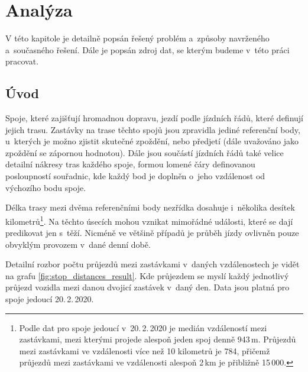 
\chapter{Analýza}

V této kapitole je detailně popsán řešený problém a~způsoby navrženého a~současného řešení. Dále je popsán zdroj dat, se kterým budeme v~této práci pracovat.

\section{Úvod}

Spoje, které zajišťují hromadnou dopravu, jezdí podle jízdních řádů, které definují jejich trasu. Zastávky na trase těchto spojů jsou zpravidla jediné referenční body, u~kterých je možno zjistit skutečné zpoždění, nebo předjetí (dále uvažováno jako zpoždění se zápornou hodnotou). Dále jsou součástí jízdních řádů také velice detailní nákresy tras každého spoje, formou lomené čáry definovanou posloupností souřadnic, kde každý bod je doplněn o~jeho vzdálenost od výchozího bodu spoje.

\bigbreak

Délka trasy mezi dvěma referenčními body nezřídka dosahuje i~několika desítek kilometrů\footnote{Podle dat pro spoje jedoucí v~20.\,2.\,2020 je medián vzdáleností mezi zastávkami, mezi kterými projede alespoň jeden spoj denně 943\,m. Průjezdů mezi zastávkami ve vzdálenosti více než 10 kilometrů je 784, přičemž průjezdů mezi zastávkami ve vzdálenosti alespoň 2\,km je přibližně 15\,000.}. Na těchto úsecích mohou vznikat mimořádné události, které se dají predikovat jen s~těží. Nicméně ve většině případů je průběh jízdy ovlivněn pouze obvyklým provozem v~dané denní době.

\bigbreak

Detailní rozbor počtu průjezdů mezi zastávkami v~daných vzdálenostech je vidět na grafu \ref{fig:stop_distances_result}. Kde průjezdem se myslí každý jednotlivý průjezd vozidla mezi danou dvojicí zastávek v~daný den. Data jsou platná pro spoje jedoucí 20.\,2.\,2020.

